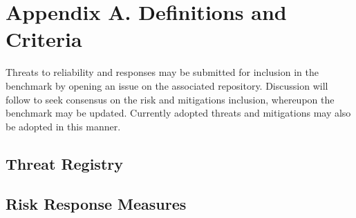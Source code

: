 \section{Appendix A. Definitions and Criteria}
Threats to reliability and responses may be submitted for inclusion in the benchmark by opening an issue on the associated repository. Discussion will follow to seek consensus on the risk and mitigations inclusion, whereupon the benchmark may be updated. Currently adopted threats and mitigations may also be adopted in this manner.

\subsection{Threat Registry}


\subsection{Risk Response Measures}
